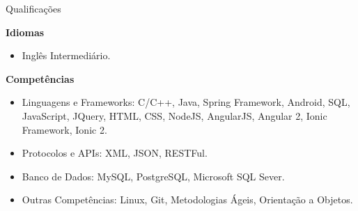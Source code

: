 \documentclass{resume} %
\begin{document}
\begin{rSection}{Qualificações}

\textbf{Idiomas}
\begin{itemize}
	\item Inglês Intermediário.
\end{itemize}

\textbf{Competências}
\begin{itemize}
	\item Linguagens e Frameworks: C/C++, Java, Spring Framework, Android, SQL, JavaScript, JQuery, HTML, CSS, NodeJS, AngularJS, Angular 2, Ionic Framework, Ionic 2.
	\item Protocolos e APIs: XML, JSON, RESTFul.
	\item Banco de Dados: MySQL, PostgreSQL, Microsoft SQL Sever.
	\item Outras Competências: Linux, Git, Metodologias Ágeis, Orientação a Objetos.
\end{itemize}

\end{rSection}
\end{document}
